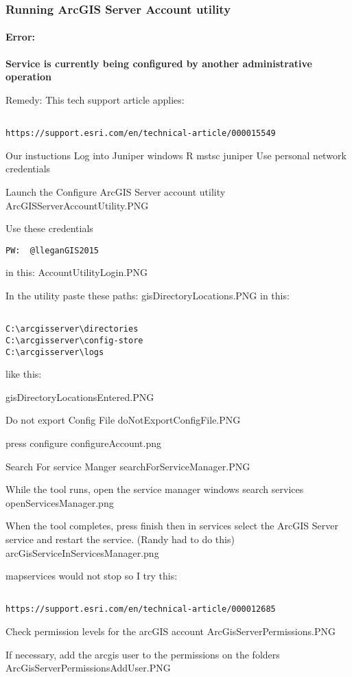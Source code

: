 \documentclass[class=book , crop=false, titlepage, twoside, multi={itemize, figure, verbatim}, float=false]{standalone}
\begin{document}
\subsubsection[Running ArcGIS Server Account utility]{Running ArcGIS Server Account utility}

\paragraph[Error:]{Error: \texorpdfstring{\\}{}}

\textbf{Service is currently being configured by another administrative operation}


Remedy:
This tech support article applies:

\begin{verbatim}

https://support.esri.com/en/technical-article/000015549

\end{verbatim}

Our instuctions
Log into Juniper
windows R mstsc  juniper
Use personal network credentials


Launch the Configure ArcGIS Server account utility
ArcGISServerAccountUtility.PNG


Use these credentials
\begin{verbatim}
PW:  @lleganGIS2015
\end{verbatim}
in this:
AccountUtilityLogin.PNG


In the utility paste these paths:
gisDirectoryLocations.PNG
in this:


\begin{verbatim}

C:\arcgisserver\directories
C:\arcgisserver\config-store
C:\arcgisserver\logs
\end{verbatim}
like this:

gisDirectoryLocationsEntered.PNG


Do not export Config File
doNotExportConfigFile.PNG


press configure
configureAccount.png


Search For service Manger
searchForServiceManager.PNG


While the tool runs, open the service manager
windows  search services
openServicesManager.png


When the tool completes, press finish
then in services
select the ArcGIS Server service and restart the service.  (Randy had to do this)
arcGisServiceInServicesManager.png


mapservices would not stop so I try this:
\begin{verbatim}

https://support.esri.com/en/technical-article/000012685
\end{verbatim}

Check permission levels for the arcGIS account
ArcGisServerPermissions.PNG


If necessary, add the arcgis user to the permissions on the folders
ArcGisServerPermissionsAddUser.PNG
\end{document}
